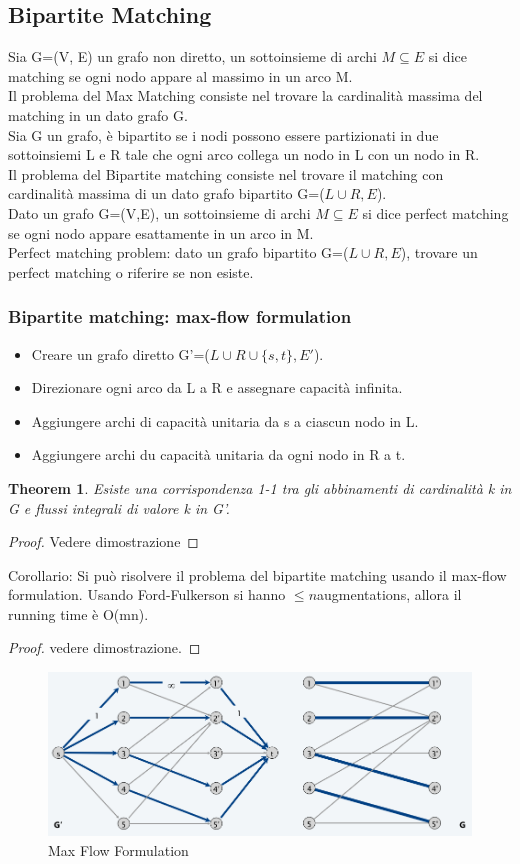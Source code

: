 \documentclass{article}
\newtheorem{theorem}{Theorem}[subsection]
\begin{document}
\subsection{Bipartite Matching}
Sia G=(V, E) un grafo non diretto, un sottoinsieme di archi $M\subseteq E$  si dice matching se ogni nodo appare al massimo in un arco M.\\
Il problema del Max Matching consiste nel trovare la cardinalità massima del matching in un dato grafo G.\\
Sia G un grafo, è bipartito se i nodi possono essere partizionati in due sottoinsiemi L e R tale che ogni arco collega un nodo in L con un nodo in R.\\
Il problema del Bipartite matching consiste nel trovare il matching con cardinalità massima di un dato grafo bipartito G=($L\cup R,E$).\\
Dato un grafo G=(V,E), un sottoinsieme di archi $M\subseteq E$ si dice perfect matching se ogni nodo appare esattamente in un arco in M.\\
Perfect matching problem: dato un grafo bipartito G=($L\cup R,E$), trovare un perfect matching o riferire se non esiste.\\
\subsubsection{Bipartite matching: max-flow formulation}
\begin{itemize}
    \item Creare un grafo diretto G'=($L \cup R \cup \{s,t\},E'$).
    \item Direzionare ogni arco da L a R e assegnare capacità infinita.
    \item Aggiungere archi di capacità unitaria da s a ciascun nodo in L.
    \item Aggiungere archi du capacità unitaria da ogni  nodo in R a t.
\end{itemize}
\begin{theorem}
    Esiste una corrispondenza 1-1 tra gli abbinamenti di cardinalità k in G e flussi integrali di valore k in G'.
\end{theorem}
\begin{proof}
 Vedere dimostrazione
\end{proof}
Corollario: Si può risolvere il problema del bipartite matching usando il max-flow formulation. Usando Ford-Fulkerson si hanno $\leq n$augmentations, allora il running time è O(mn).
\begin{proof}
    vedere dimostrazione.
\end{proof}
\begin{figure}[H]
    \centering
    \includegraphics[width=0.5\linewidth]{Screenshot from 2024-05-05 11-22-39.png}
    \caption{Max Flow Formulation}
    \label{fig:enter-label}
\end{figure}
\newpage
\end{document}
